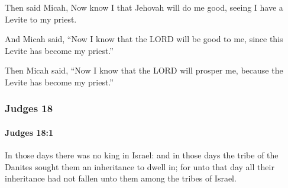 			\begin{versebox}
					\item[BHS] 
					\item[ASV] Then said Micah, Now know I that Jehovah will do me good, seeing I have a Levite to my priest.
					\item[NIV] And Micah said, “Now I know that the LORD will be good to me, since this Levite has become my priest.”
					\item[NRSV] Then Micah said, “Now I know that the LORD will prosper me, because the Levite has become my priest.”
			\end{versebox}
	\subsubsection{Judges 18} %
		\label{JUDGES-18}

		\paragraph{Judges 18:1} %
			\label{JUDGES-18-1}

			In those days there was no king in Israel: and in those days the tribe of the Danites sought them an inheritance to dwell in; for unto that day all their inheritance had not fallen unto them among the tribes of Israel.

